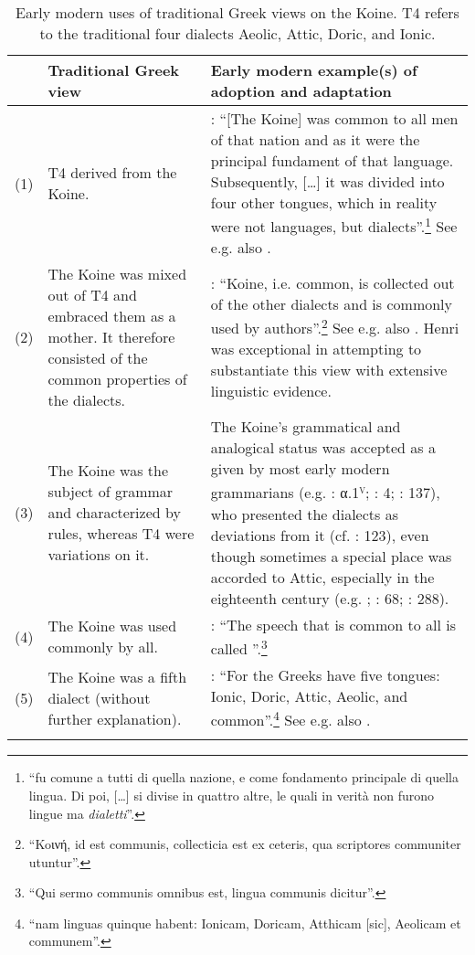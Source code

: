 \begin{sidewaystable}\footnotesize
\caption{Early modern uses of traditional Greek views on the Koine. T4 refers to the traditional four dialects Aeolic, Attic, Doric, and Ionic.\label{tab:2.2}}
\begin{tabularx}{\textwidth}{l@{ }QQ}
\lsptoprule 
 & {Traditional Greek view} & Early modern example(s) of adoption and adaptation\\\midrule
 (1) & T4 derived from the Koine. & \citet[335]{Borghini1971}: “[The Koine] was common to all men of that nation and as it were the principal fundament of that language. Subsequently, […] it was divided into four other tongues, which in reality were not languages, but dialects”.\footnote{“fu comune a tutti di quella nazione, e come fondamento principale di quella lingua. Di poi, […] si divise in quattro altre, le quali in verità non furono lingue ma \textit{dialetti}”.} See e.g. also \citet[209]{Vergara1537}.\\
 (2) & The Koine was mixed out of T4 and embraced them as a mother. It therefore consisted of the common properties of the dialects. & \citet[52]{Oecolampadius1518}: “Koine, i.e. common, is collected out of the other dialects and is commonly used by authors”.\footnote{“Koινή, id est communis, collecticia est ex ceteris, qua scriptores communiter utuntur”.} See e.g. also \citet[10\textsc{\textsuperscript{r}}\textsc{–10}\textsc{\textsuperscript{v}}]{Girard1541}. Henri \citet[28--34]{Estienne1581} was exceptional in attempting to substantiate this view with extensive linguistic evidence.\\
 (3) & The Koine was the subject of grammar and characterized by rules, whereas T4 were variations on it. & The Koine’s grammatical and analogical status was accepted as a given by most early modern grammarians (e.g. \citealt{Gaza1495}: α.1\textsc{\textsuperscript{v}}; \citealt{Schmidt1604}: 4; \citealt{Walch1772}: 137), who presented the dialects as deviations from it (cf. \citealt{Ciccolella2008}: 123), even though sometimes a special place was accorded to Attic, especially in the eighteenth century (e.g. \citealt{Luscinius1517}; \citealt{Hemsterhuis1721}: 68; \citealt{Jehne1782}: 288).\\
 (4) & The Koine was used commonly by all. & \citet[a.i\textsc{\textsuperscript{v}}]{Melanchthon1518}: “The speech that is common to all is called ”.\footnote{“Qui sermo communis omnibus est, lingua communis dicitur”.}\\
 (5) & The Koine was a fifth dialect (without further explanation). & \citet[138\textsc{\textsuperscript{v}}]{Beroaldo1493}: “For the Greeks have five tongues: Ionic, Doric, Attic, Aeolic, and common”.\footnote{“nam linguas quinque habent: Ionicam, Doricam, Atthicam [sic], Aeolicam et communem”.} See e.g. also \citet[85\textsc{\textsuperscript{r}}]{Perotti1489}.\\
\lspbottomrule
\end{tabularx}
\end{sidewaystable}

